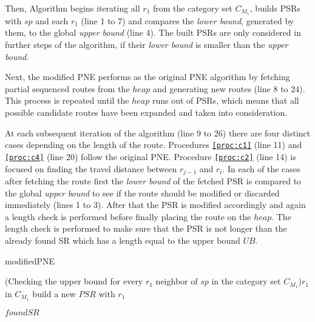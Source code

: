 Then, Algorithm \texttt{} begins iterating all $r_1$ from the category set $C_{M_1}$, builds PSRs with $sp$ and each $r_1$ (line 1 to 7) and compares the \textit{lower bound}, generated by them, to the global \textit{upper bound} (line 4). The built PSRs are only considered in further steps of the algorithm, if their \textit{lower bound} is smaller than the \textit{upper bound}.

Next, the modified PNE performs as the original PNE algorithm by fetching partial sequenced routes from the $heap$ and generating new routes (line 8 to 24). This process is repeated until the $heap$ runs out of PSRs, which means that all possible candidate routes have been expanded and taken into consideration.

At each subsequent iteration of the algorithm \texttt{} (line 9 to 26) there are four distinct cases depending on the length of the route. Procedures \newline \texttt{\ref{proc:c1}} (line 11) and \texttt{\ref{proc:c4}} (line 20) follow the original PNE. Procedure \texttt{\ref{proc:c2}} (line 14) is focused on finding the travel distance between $r_{j-1}$ and $r_i$. In each of the cases after fetching the route first the \textit{lower bound} of the fetched PSR is compared to the global \textit{upper bound} to see if the route should be modified or discarded immediately (lines 1 to 3). After that the PSR is modified accordingly and again a length check is performed before finally placing the route on the $heap$. The length check is performed to make sure that the PSR is not longer than the already found SR which has a length equal to the upper bound $UB$.  

\begin{algorithm}[htb!]
\caption{modifiedPNE}
\label{alg:mPNE}
	
	\ForEach(Checking the upper bound for every $r_1$ neighbor of $sp$ in the category set $C_{M_1}$){$r_1$ in $C_{M_1}$}{
		build a new $PSR$ with $r_1$\;
	}
	
	
	\Return $foundSR$
	
\end{algorithm}

